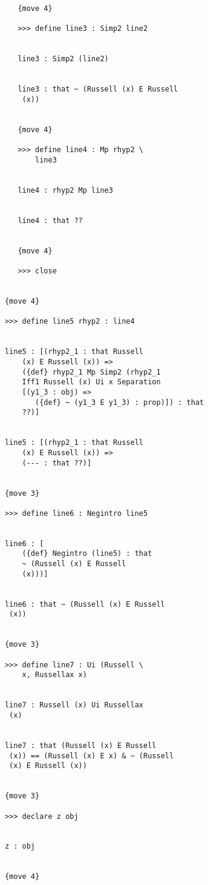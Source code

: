 \documentclass[12pt]{article}
\begin{document}
\begin{verbatim}
               {move 4}

               >>> define line3 : Simp2 line2


               line3 : Simp2 (line2)


               line3 : that ~ (Russell (x) E Russell 
                (x))


               {move 4}

               >>> define line4 : Mp rhyp2 \
                   line3


               line4 : rhyp2 Mp line3


               line4 : that ??


               {move 4}

               >>> close


            {move 4}

            >>> define line5 rhyp2 : line4


            line5 : [(rhyp2_1 : that Russell 
                (x) E Russell (x)) => 
                ({def} rhyp2_1 Mp Simp2 (rhyp2_1 
                Iff1 Russell (x) Ui x Separation 
                [(y1_3 : obj) => 
                   ({def} ~ (y1_3 E y1_3) : prop)]) : that 
                ??)]


            line5 : [(rhyp2_1 : that Russell 
                (x) E Russell (x)) => 
                (--- : that ??)]


            {move 3}

            >>> define line6 : Negintro line5


            line6 : [
                ({def} Negintro (line5) : that 
                ~ (Russell (x) E Russell 
                (x)))]


            line6 : that ~ (Russell (x) E Russell 
             (x))


            {move 3}

            >>> define line7 : Ui (Russell \
                x, Russellax x)


            line7 : Russell (x) Ui Russellax 
             (x)


            line7 : that (Russell (x) E Russell 
             (x)) == (Russell (x) E x) & ~ (Russell 
             (x) E Russell (x))


            {move 3}

            >>> declare z obj


            z : obj


            {move 4}


\end{verbatim}
\end{document}
